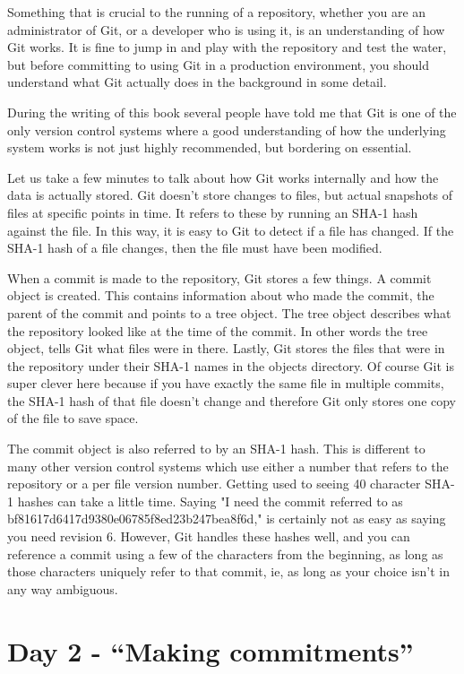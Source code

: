 Something that is crucial to the running of a repository, whether you are an administrator of Git, or a developer who is using it, is an understanding of how Git works.  It is fine to jump in and play with the repository and test the water, but before committing to using Git in a production environment, you should understand what Git actually does in the background in some detail. 

During the writing of this book several people have told me that Git is one of the only version control systems where a good understanding of how the underlying system works is not just highly recommended, but bordering on essential. 

Let us take a few minutes to talk about how Git works internally and how the data is actually stored.  Git doesn't store changes to files, but actual snapshots of files at specific points in time.  It refers to these by running an SHA-1 hash against the file.  In this way, it is easy to Git to detect if a file has changed.  If the SHA-1 hash of a file changes, then the file must have been modified. 

When a commit is made to the repository, Git stores a few things.  A commit object is created.  This contains information about who made the commit, the parent of the commit and points to a tree object.  The tree object describes what the repository looked like at the time of the commit.  In other words the tree object, tells Git what files were in there.  Lastly, Git stores the files that were in the repository under their SHA-1 names in the objects directory.  Of course Git is super clever here because if you have exactly the same file in multiple commits, the SHA-1 hash of that file doesn't change and therefore Git only stores one copy of the file to save space.

The commit object is also referred to by an SHA-1 hash.  This is different to many other version control systems which use either a number that refers to the repository or a per file version number.  Getting used to seeing 40 character SHA-1 hashes can take a little time.  Saying "I need the commit referred to as  bf81617d6417d9380e06785f8ed23b247bea8f6d," is certainly not as easy as saying you need revision 6.  However, Git handles these hashes well, and you can reference a commit using a few of the characters from the beginning, as long as those characters uniquely refer to that commit, ie, as long as your choice isn't in any way ambiguous.

\section{Day 2 - ``Making commitments''}

